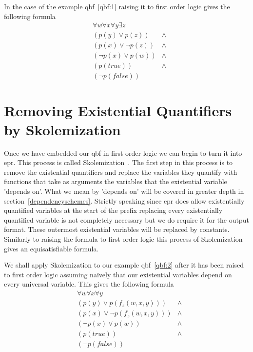 In the case of the example \gls{qbf}~\ref{qbf:1} raising it to first order logic gives the following formula
\begin{equation} \label{qbf:2}
\begin{aligned}
&\forall w \forall x \forall y \exists z\\
&(p(y) \lor p(z)) &\land\\
&(p(x) \lor \neg p(z)) &\land\\
&(\neg p(x) \lor p(w)) &\land\\
&(p(true)) &\land\\
&(\neg p(false))
\end{aligned}
\end{equation}

\section{Removing Existential Quantifiers by Skolemization} \label{skolemization}
Once we have embedded our \gls{qbf} in first order logic we can begin to turn it into \gls{epr}. This process is called Skolemization~\cite{skolemization}. The first step in this process is to remove the existential quantifiers and replace the variables they quantify with functions that take as arguments the variables that the existential variable 'depends on'. What we mean by 'depends on' will be covered in greater depth in section~\ref{dependencyschemes}. Strictly speaking since \gls{epr} does allow existentially quantified variables at the start of the prefix replacing every existentially quantified variable is not completely necessary but we do require it for the output format. These outermost existential variables will be replaced by constants. Similarly to raising the formula to first order logic this process of Skolemization gives an equisatisfiable formula.

We shall apply Skolemization to our example \gls{qbf}~\ref{qbf:2} after it has been raised to first order logic assuming na{\"i}vely that our existential variables depend on every universal variable. This gives the following formula
\begin{equation} \label{qbf:3}
\begin{aligned}
&\forall w \forall x \forall y\\
&(p(y) \lor p(f_z(w, x, y))) &\land\\
&(p(x) \lor \neg p(f_z(w, x, y))) &\land\\
&(\neg p(x) \lor p(w)) &\land\\
&(p(true)) &\land\\
&(\neg p(false))
\end{aligned}
\end{equation}

